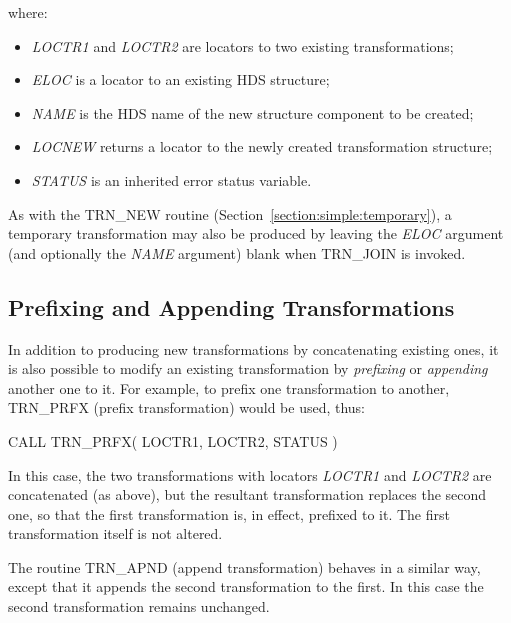 \documentclass[twoside,nolof,11pt]{starlink}
\providecommand{\name}[1]{\small{#1}}
\providecommand{\fortvar}[1]{\emph{#1}}
\begin{document}
where:

\begin{itemize}

\item \fortvar{LOCTR1} and \fortvar{LOCTR2} are locators to two existing
transformations;

\item \fortvar{ELOC} is a locator to an existing \name{HDS} structure;

\item \fortvar{NAME} is the \name{HDS} name of the new structure component
to be created;

\item \fortvar{LOCNEW} returns a locator to the newly created transformation
structure;

\item \fortvar{STATUS} is an inherited error status variable.

\end{itemize}

As with the \name{TRN\_NEW} routine
(Section~\ref{section:simple:temporary}), a temporary transformation may
also be produced by leaving the \fortvar{ELOC} argument (and optionally the
\fortvar{NAME} argument) blank when \name{TRN\_JOIN} is invoked.


\subsection{Prefixing and Appending Transformations}

\label{section:additional:prefix}

In addition to producing new transformations by concatenating existing ones,
it is also possible to modify an existing transformation by \emph{prefixing}
or \emph{appending} another one to it.
For example, to prefix one transformation to another, \name{TRN\_PRFX}
(prefix transformation) would be used, thus:

\begin{terminalv}
CALL TRN_PRFX( LOCTR1, LOCTR2, STATUS )
\end{terminalv}

In this case, the two transformations with locators \fortvar{LOCTR1} and
\fortvar{LOCTR2} are concatenated (as above), but the resultant
transformation replaces the second one, so that the first transformation is,
in effect, prefixed to it.
The first transformation itself is not altered.

The routine \name{TRN\_APND} (append transformation) behaves in a similar
way, except that it appends the second transformation to the first. In this
case the second transformation remains unchanged.
\end{document}
